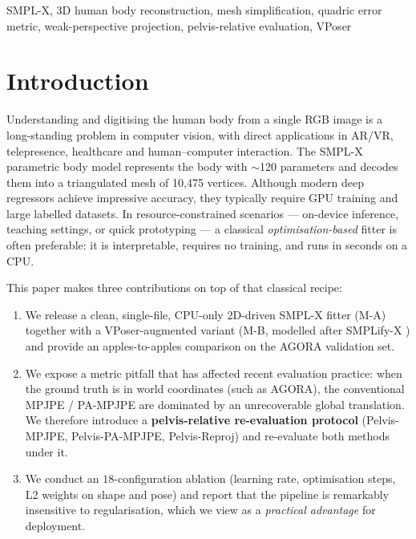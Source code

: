 \documentclass[conference]{IEEEtran}
\begin{document}
\begin{IEEEkeywords}
SMPL-X, 3D human body reconstruction, mesh simplification, quadric error metric, weak-perspective projection, pelvis-relative evaluation, VPoser
\end{IEEEkeywords}

\section{Introduction}
\label{sec:intro}

Understanding and digitising the human body from a single RGB image is a long-standing problem in computer vision, with direct applications in AR/VR, telepresence, healthcare and human--computer interaction. The SMPL-X \cite{SMPLX} parametric body model represents the body with $\sim$120 parameters and decodes them into a triangulated mesh of 10,475 vertices. Although modern deep regressors \cite{HMR,SPIN,ExPose,PIXIE} achieve impressive accuracy, they typically require GPU training and large labelled datasets. In resource-constrained scenarios --- on-device inference, teaching settings, or quick prototyping --- a classical \emph{optimisation-based} fitter is often preferable: it is interpretable, requires no training, and runs in seconds on a CPU.

This paper makes three contributions on top of that classical recipe:

\begin{enumerate}
    \item We release a clean, single-file, CPU-only 2D-driven SMPL-X fitter (\textsc{M-A}) together with a VPoser-augmented variant (\textsc{M-B}, modelled after SMPLify-X \cite{SMPLifyX}) and provide an apples-to-apples comparison on the AGORA \cite{AGORA} validation set.
    \item We expose a metric pitfall that has affected recent evaluation practice: when the ground truth is in world coordinates (such as AGORA), the conventional MPJPE / PA-MPJPE are dominated by an unrecoverable global translation. We therefore introduce a \textbf{pelvis-relative re-evaluation protocol} (Pelvis-MPJPE, Pelvis-PA-MPJPE, Pelvis-Reproj) and re-evaluate both methods under it.
    \item We conduct an $18$-configuration ablation (learning rate, optimisation steps, L2 weights on shape and pose) and report that the pipeline is remarkably insensitive to regularisation, which we view as a \emph{practical advantage} for deployment.
\end{enumerate}
\end{document}
